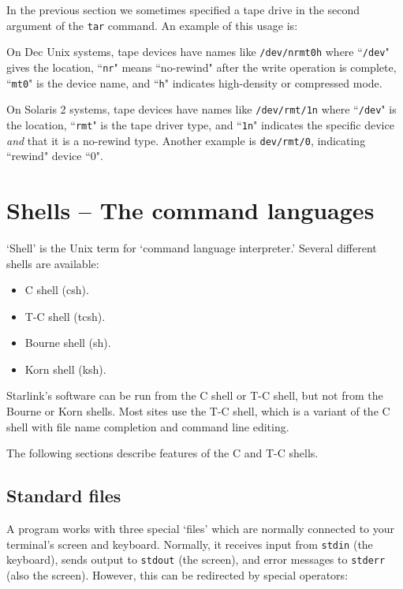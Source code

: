\documentclass[twoside,11pt,nolof]{starlink}
\begin{document}
In the previous section we sometimes specified a tape drive in the second
argument of the \texttt{tar} command.
An example of this usage is:
\begin{terminalv}
\end{terminalv}
On Dec Unix systems, tape devices have names like \texttt{/dev/nrmt0h} where
``\texttt{/dev}" gives the location,
``\texttt{nr}" means ``no-rewind" after the write operation is complete,
``\texttt{mt0}" is the device name, and
``\texttt{h}" indicates high-density or compressed mode.

On Solaris 2 systems, tape devices have names like \texttt{/dev/rmt/1n} where
``\texttt{/dev}" is the location,
``\texttt{rmt}" is the tape driver type, and
``\texttt{1n}" indicates the specific device \emph{and}\/ that it is a
no-rewind type.
Another example is \texttt{dev/rmt/0}, indicating ``rewind" device ``0".

\newpage

\section{Shells -- The command languages}

`Shell' is the Unix term for `command language interpreter.'
Several different shells are available:
\begin{itemize}
\item C shell (csh).
\item T-C shell (tcsh).
\item Bourne shell (sh).
\item Korn shell (ksh).
\end{itemize}
Starlink's software can be run from the C shell or T-C shell, but
not from the Bourne or Korn shells.
Most sites use the T-C shell, which is a variant of the C shell
with file name completion and command line editing.

The following sections describe features of the C and T-C shells.

\subsection{Standard files}

A program works with three special `files' which are normally connected to your
terminal's screen and keyboard.
Normally, it receives input from \texttt{stdin} (the keyboard), sends output to
\texttt{stdout} (the screen), and error messages to \texttt{stderr} (also the screen).
However, this can be redirected by special operators:
\end{document}
